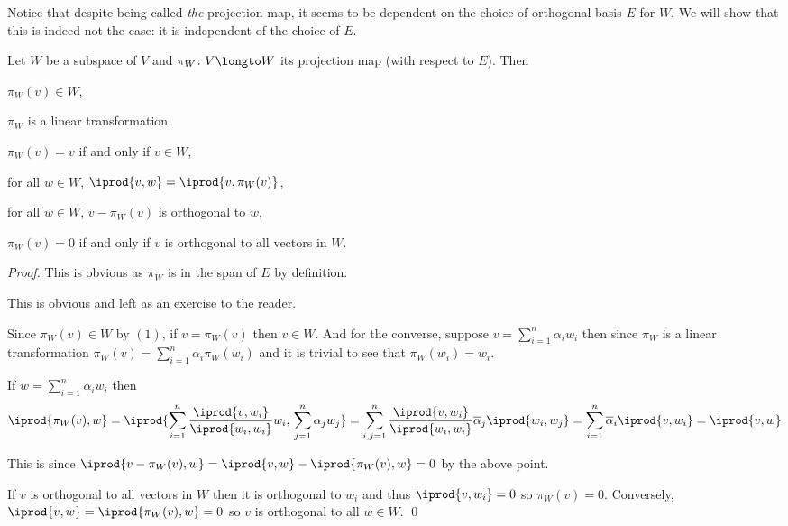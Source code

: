 Notice that despite being called \textit{the} projection map, it seems to be dependent on the choice of orthogonal basis $E$ for $W$.
We will show that this is indeed not the case: it is independent of the choice of $E$.

\begin{lemm*}

    Let $W$ be a subspace of $V$ and $\pi_W\colon V\longto W$ its projection map (with respect to $E$).
    Then
    \benum
        \item $\pi_W(v)\in W$,
        \item $\pi_W$ is a linear transformation,
        \item $\pi_W(v)=v$ if and only if $v\in W$,
        \item for all $w\in W$, $\iprod{v,w}=\iprod{v,\pi_W(v)}$,
        \item for all $w\in W$, $v-\pi_W(v)$ is orthogonal to $w$,
        \item $\pi_W(v)=0$ if and only if $v$ is orthogonal to all vectors in $W$.
    \eenum

\end{lemm*}

\begin{proof}

    \benum
        \item This is obvious as $\pi_W$ is in the span of $E$ by definition.
        \item This is obvious and left as an exercise to the reader.
        \item Since $\pi_W(v)\in W$ by $(1)$, if $v=\pi_W(v)$ then $v\in W$.
            And for the converse, suppose $v=\sum_{i=1}^n\alpha_iw_i$ then since $\pi_W$ is a linear transformation $\pi_W(v)=\sum_{i=1}^n\alpha_i\pi_W(w_i)$ and it is trivial to see that $\pi_W(w_i)=w_i$.
        \item If $w=\sum_{i=1}^n\alpha_iw_i$ then
            \[ \iprod{\pi_W(v),w} = \iprod{\sum_{i=1}^n\frac{\iprod{v,w_i}}{\iprod{w_i,w_i}}w_i,\,\sum_{j=1}^n\alpha_jw_j} =
            \sum_{i,j=1}^n\frac{\iprod{v,w_i}}{\iprod{w_i,w_i}}\overline\alpha_j\iprod{w_i,w_j} = \sum_{i=1}^n\overline\alpha_i\iprod{v,w_i} = \iprod{v,w} \]
        \item This is since $\iprod{v-\pi_W(v),w}=\iprod{v,w}-\iprod{\pi_W(v),w}=0$ by the above point.
        \item If $v$ is orthogonal to all vectors in $W$ then it is orthogonal to $w_i$ and thus $\iprod{v,w_i}=0$ so $\pi_W(v)=0$.
            Conversely, $\iprod{v,w}=\iprod{\pi_W(v),w}=0$ so $v$ is orthogonal to all $w\in W$.
            \qed
    \eenum

\end{proof}

